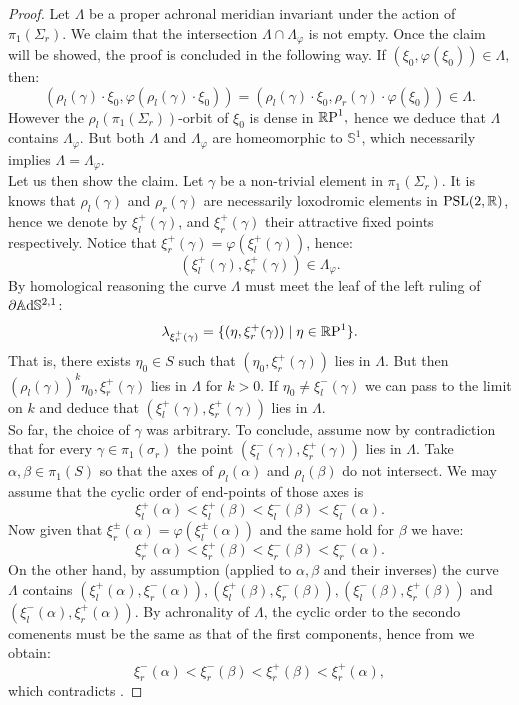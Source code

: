 \begin{proof}
    Let $\Lambda$ be a proper achronal meridian invariant under the action of $\pi_1(\Sigma_r)$. We claim that the intersection $\Lambda\cap \Lambda_\varphi$ is not empty. Once the claim will be showed, the proof is concluded in the following way. If $(\xi_0 , \varphi(\xi_0))\in\Lambda,$ then: 
    \[
        (\rho_l(\gamma)\cdot\xi_0,\varphi(\rho_l(\gamma)\cdot\xi_0))=(\rho_l(\gamma)\cdot\xi_0,\rho_r(\gamma)\cdot\varphi(\xi_0))\in\Lambda.
    \] 
    However the $\rho_l(\pi_1(\Sigma_r))$-orbit of $\xi_0$ is dense in $\S,$ hence we deduce that $\Lambda$ contains $\Lambda_\varphi$. But both $\Lambda$ and $\Lambda_\varphi$ are homeomorphic to $\mathbb{S}^1$, which necessarily implies $\Lambda=\Lambda_\varphi.$\\
    Let us then show the claim. Let $\gamma$ be a non-trivial element in $\pi_1(\Sigma_r)$. It is knows that $\rho_l(\gamma)$ and $\rho_r(\gamma)$ are necessarily loxodromic elements in $\PSL$, hence we denote by $\xi_l^+(\gamma)$, and $\xi_r^+(\gamma)$ their attractive fixed points respectively. Notice that $\xi_r^+(\gamma)=\varphi(\xi_l^+(\gamma))$, hence: 
    \[
        (\xi_l^+(\gamma),\xi_r^+(\gamma))\in \Lambda_\varphi.
    \]
    By homological reasoning the curve $\Lambda$ must meet the leaf of the left ruling of $\partial\A^{2,1}$: 
    \[
        \lambda_{\xi_r^+(\gamma)}=\{(\eta,\xi_r^+(\gamma))\;|\;\eta\in\S\}.
    \]
    That is, there exists $\eta_0\in S$ such that $(\eta_0,\xi_r^+(\gamma))$ lies in $\Lambda$. But then $(\rho_l(\gamma))^k\eta_0,\xi_r^+(\gamma)$ lies in $\Lambda$ for $k>0$. If $\eta_0\neq \xi_l^-(\gamma)$ we can pass to the limit on $k$ and deduce that $(\xi_l^+(\gamma),\xi_r^+(\gamma))$ lies in $\Lambda.$ \\
    So far, the choice of $\gamma$ was arbitrary. To conclude, assume now by contradiction that for every $\gamma\in\pi_1(\sigma_r)$ the point $(\xi_l^-(\gamma),\xi_r^+(\gamma))$ lies in $\Lambda$. Take $\alpha,\beta\in\pi_1(S)$ so that the axes of $\rho_l(\alpha)$ and $\rho_l(\beta)$ do not intersect. We may assume that the cyclic order of end-points of those axes is 
    \begin{equation}\label{57}
        \xi_l^+(\alpha)<\xi_l^+(\beta)<\xi_l^-(\beta)<\xi_l^-(\alpha).
    \end{equation}
    Now given that $\xi_r^\pm(\alpha)=\varphi(\xi_l^\pm(\alpha))$ and the same hold for $\beta$ we have: 
\begin{equation}\label{58}
    \xi_r^+(\alpha)<\xi_r^+(\beta)<\xi_r^-(\beta)<\xi_r^-(\alpha).
\end{equation}
On the other hand, by assumption (applied to $\alpha,\beta$ and their inverses) the curve $\Lambda$ contains $(\xi_l^+(\alpha),\xi_r^-(\alpha)),(\xi_l^+(\beta),\xi _r^-(\beta)), (\xi_l^-(\beta ),\xi_r^+(\beta ))$ and $(\xi_l^-(\alpha),\xi_r^+(\alpha)).$ By achronality of $\Lambda$, the cyclic order to the secondo comenents must be the same as that of the first components, hence from  we obtain: 
\[
    \xi_r^-(\alpha)<\xi_r^-(\beta)<\xi_r^+(\beta)<\xi_r^+(\alpha),
\]
which contradicts .
\end{proof}

